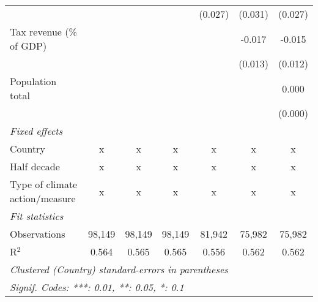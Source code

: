 \begin{tabular}{lcccccc}
                                                            &         &               &                & (0.027)        & (0.031)        & (0.027)\\   
   Tax revenue (\% of GDP)                                  &         &               &                &                & -0.017         & -0.015\\   
                                                            &         &               &                &                & (0.013)        & (0.012)\\   
   Population total                                         &         &               &                &                &                & 0.000\\   
                                                            &         &               &                &                &                & (0.000)\\   
   \emph{Fixed effects}\\
   Country                                                  & x       & x             & x              & x              & x              & x\\  
   Half decade                                              & x       & x             & x              & x              & x              & x\\  
   Type of climate action/measure                           & x       & x             & x              & x              & x              & x\\  
   \midrule \emph{Fit statistics}\\
   Observations                                             & 98,149  & 98,149        & 98,149         & 81,942         & 75,982         & 75,982\\  
   R$^2$                                                    & 0.564   & 0.565         & 0.565          & 0.556          & 0.562          & 0.562\\  
   \midrule
   \multicolumn{7}{l}{\emph{Clustered (Country) standard-errors in parentheses}}\\
   \multicolumn{7}{l}{\emph{Signif. Codes: ***: 0.01, **: 0.05, *: 0.1}}\\
\end{tabular}
\par\endgroup


